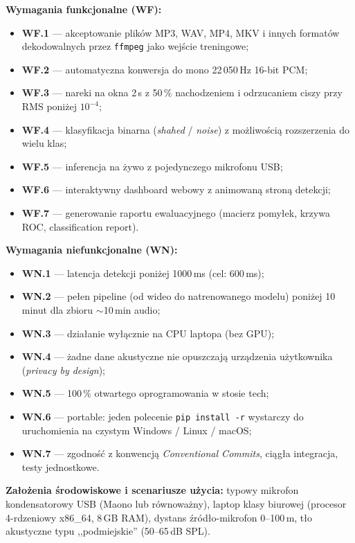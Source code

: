 \documentclass[11pt,a4paper]{article}
\begin{document}
\textbf{Wymagania funkcjonalne (WF):}
\begin{itemize}[noitemsep]
  \item \textbf{WF.1} --- akceptowanie plików MP3, WAV, MP4, MKV i innych
        formatów dekodowalnych przez \texttt{ffmpeg} jako wejście treningowe;
  \item \textbf{WF.2} --- automatyczna konwersja do mono 22\,050\,Hz 16-bit PCM;
  \item \textbf{WF.3} --- nareki na okna 2\,s z 50\,\% nachodzeniem i odrzucaniem
        ciszy przy RMS poniżej $10^{-4}$;
  \item \textbf{WF.4} --- klasyfikacja binarna (\emph{shahed} / \emph{noise})
        z możliwością rozszerzenia do wielu klas;
  \item \textbf{WF.5} --- inferencja na żywo z pojedynczego mikrofonu USB;
  \item \textbf{WF.6} --- interaktywny dashboard webowy z animowaną stroną
        detekcji;
  \item \textbf{WF.7} --- generowanie raportu ewaluacyjnego (macierz pomyłek,
        krzywa ROC, classification report).
\end{itemize}

\textbf{Wymagania niefunkcjonalne (WN):}
\begin{itemize}[noitemsep]
  \item \textbf{WN.1} --- latencja detekcji poniżej 1000\,ms (cel: 600\,ms);
  \item \textbf{WN.2} --- pełen pipeline (od wideo do natrenowanego modelu)
        poniżej 10\,minut dla zbioru $\sim$10\,min audio;
  \item \textbf{WN.3} --- działanie wyłącznie na CPU laptopa (bez GPU);
  \item \textbf{WN.4} --- żadne dane akustyczne nie opuszczają urządzenia
        użytkownika (\emph{privacy by design});
  \item \textbf{WN.5} --- 100\,\% otwartego oprogramowania w stosie tech;
  \item \textbf{WN.6} --- portable: jeden polecenie \texttt{pip install -r}
        wystarczy do uruchomienia na czystym Windows / Linux / macOS;
  \item \textbf{WN.7} --- zgodność z konwencją \emph{Conventional Commits},
        ciągła integracja, testy jednostkowe.
\end{itemize}

\textbf{Założenia środowiskowe i scenariusze użycia:} typowy mikrofon kondensatorowy
USB (Maono lub równoważny), laptop klasy biurowej (procesor 4-rdzeniowy x86\_64,
8\,GB RAM), dystans źródło-mikrofon 0--100\,m, tło akustyczne typu
,,podmiejskie'' (50--65\,dB SPL).
\end{document}
